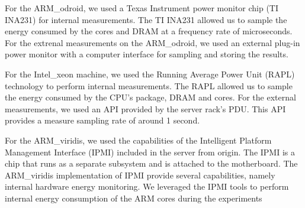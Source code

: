 For the ARM\_odroid, we used a Texas Instrument power monitor chip (TI INA231) for internal measurements. The TI INA231 allowed us to sample the energy consumed by the cores and DRAM at a frequency rate of microseconds. For the extrenal measurements on the ARM\_odroid, we used an external plug-in power monitor with a computer interface for sampling and storing the results.

For the Intel\_xeon machine, we used the Running Average Power Unit (RAPL) technology to perform internal measurements. The RAPL allowed us to sample the energy consumed by the CPU's package, DRAM and cores. For the external measurements, we used an API provided by the server rack's PDU. This API provides a measure sampling rate of around 1 second. 

For the ARM\_viridis, we used the capabilities of the Intelligent Platform Management Interface (IPMI) \cite{IPMI} included in the server from origin. The IPMI is a chip that runs as a separate subsystem and is attached to the motherboard. The ARM\_viridis implementation of IPMI provide several capabilities, namely internal hardware energy monitoring. We leveraged the IPMI tools to perform internal energy consumption of the ARM cores during the experiments



